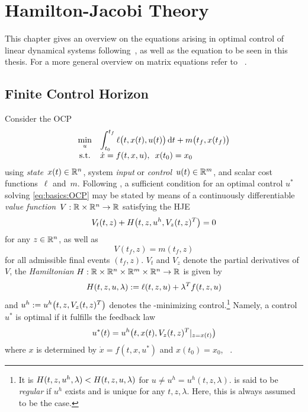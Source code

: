 \chapter{Hamilton-Jacobi Theory}
\label{sec:HJT}

This chapter gives an overview on the \Riccati equations arising in optimal control
of linear dynamical systems following~\cite{Locatelli2011},
as well as the \Lyapunov equation to be seen in this thesis.
For a more general overview on matrix equations refer to \eg~\cite{Simoncini2016}.

\section{Finite Control Horizon}
\label{sec:basics:HJT}

Consider the \ac{OCP}
\begin{equation}
  \everymath{\displaystyle}
  \begin{array}{cl}
    \min_u & \int_{t_0}^{t_f} \ell\big(t, x(t), u(t)\big) \dt + m\big(t_f, x(t_f)\big) \\
    \text{s.t.} & \dot{x} = f(t,x,u), \enspace x(t_0) = x_0
  \end{array}
  \label{eq:basics:OCP}
\end{equation}
using \emph{state}~$x(t)\in\mathbb{R}^n$, system \emph{input} or \emph{control}~$u(t)\in\mathbb{R}^m$,
and scalar cost functions~$\ell$ and~$m$.
Following \cite{Locatelli2011},
a sufficient condition for
an optimal control $u^*$ solving \eqref{eq:basics:OCP} may be stated by means of a
continuously differentiable
\emph{value function}~$V:\mathbb{R}\times\mathbb{R}^n\to\mathbb{R}$ satisfying the \ac{HJE}
\begin{equation}
  V_t(t,z) + H\big(t,z,u^h,V_z(t,z)^T \big) = 0
  \label{eq:basics:HJE}
\end{equation}
for any $z\in\mathbb{R}^n$,
as well as
\begin{equation}
  V(t_f,z) = m(t_f,z)
  \label{eq:basics:HJE:condition}
\end{equation}
for all admissible final events $(t_f,z)$.
$V_t$ and $V_z$ denote the partial derivatives of $V$,
the \emph{Hamiltonian} $H:\mathbb{R}\times\mathbb{R}^n\times\mathbb{R}^m\times\mathbb{R}^n\to\mathbb{R}$ is given by
\begin{equation}
\label{eq:basics:Hamiltonian}
  H(t,z,u,\lambda) := \ell(t,z,u) + \lambda^T f(t,z,u)
\end{equation}
and $u^h := u^h\big(t,z,V_z(t, z)^T\big)$ denotes the \Ham-minimizing control.\footnote{%
  It is $H(t, z, u^h, \lambda) < H(t, z, u, \lambda)$ for $u \neq u^h = u^h(t, z, \lambda)$.
  \Ham{} is said to be \emph{regular} if $u^h$ exists and is unique for any $t, z, \lambda$.
  Here, this is always assumed to be the case.
}
Namely, a control $u^*$ is optimal if it fulfills the feedback law
\begin{equation}
\label{eq:basics:HJ:feedback}
  u^*(t) = u^h\big(t, x(t), V_z(t,z)^T |_{z=x(t)} \big)
\end{equation}
where $x$ is determined by $\dot x = f(t, x, u^*)$ and $x(t_0) = x_0$,
\cf~\cite[Corollary~2.1]{Locatelli2011}.

